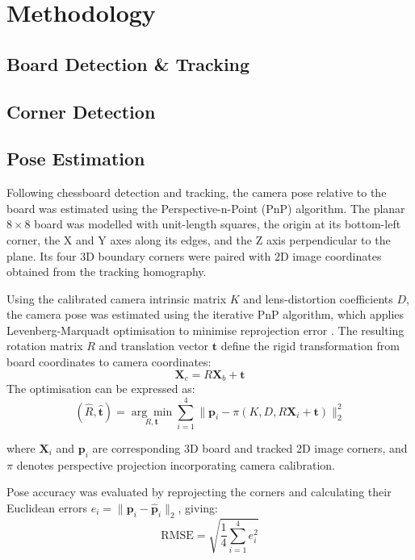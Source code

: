 \section{Methodology}
\subsection{Board Detection \& Tracking}

\subsection{Corner Detection}

\subsection{Pose Estimation}
Following chessboard detection and tracking, the camera pose relative to the board was estimated using the Perspective-n-Point (PnP) algorithm. The planar $8\times 8$ board was modelled with unit-length squares, the origin at its bottom-left corner, the X and Y axes along its edges, and the Z axis perpendicular to the plane. Its four 3D boundary corners were paired with 2D image coordinates obtained from the tracking homography.

Using the calibrated camera intrinsic matrix \(K\) and lens-distortion coefficients \(D\), the camera pose was estimated using the iterative PnP algorithm, which applies Levenberg-Marquadt optimisation to minimise reprojection error \cite{marchand2016, opencvPnP}. The resulting rotation matrix \(R\) and translation vector \(\mathbf{t}\) define the rigid transformation from board coordinates to camera coordinates:
\begin{equation*}
    \mathbf{X}_c=R\mathbf{X}_b+\mathbf{t}
\end{equation*}
The optimisation can be expressed as:
\begin{equation*}
    (\hat{R},\hat{\mathbf{t}})=\underset{R,\mathbf{t}}{\arg\min}
    \sum_{i=1}^{4}
    \lVert\mathbf{p}_i-
    \pi(K,D,R\mathbf{X}_i+\mathbf{t})\rVert_2^2
\end{equation*}

where $\mathbf{X}_i$ and $\mathbf{p}_i$ are corresponding 3D board and tracked 2D image corners, and $\pi$ denotes perspective projection incorporating camera calibration.

Pose accuracy was evaluated by reprojecting the corners and calculating their Euclidean errors $e_i=\lVert\mathbf{p}_i-\hat{\mathbf{p}}_i\rVert_2$, giving:
\begin{equation*}
    \mathrm{RMSE}=\sqrt{\frac{1}{4}\sum_{i=1}^{4}e_i^2}
\end{equation*}


